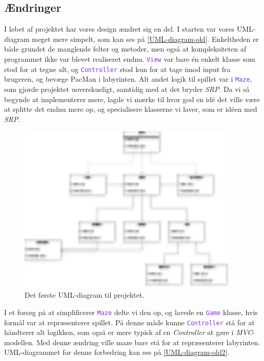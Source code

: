 \documentclass{article}
\newcommand{\class}[1]{\textcolor{BlueViolet}{\small\texttt{#1}}}
\theoremstyle{mytheoremstyle}
\theoremstyle{mytheoremstyle}
\theoremstyle{myproblemstyle}
\begin{document}
\subsection{Ændringer}\label{sub:Ændringer} %
I løbet af projektet har vores design ændret sig en del. I starten var vores
UML-diagram meget mere simpelt, som kan ses på \autoref{UML-diagram-old}.
Enkeltheden er både grundet de manglende felter og metoder, men også at
kompleksiteten af programmet ikke var blevet realiseret endnu. \class{View} var
bare én enkelt klasse som stod for at tegne alt, og \class{Controller} stod kun
for at tage imod input fra brugeren, og bevæge PacMan i labyrinten. Alt
andet logik til spillet var i \class{Maze}, som gjorde projektet uoverskueligt,
samtidig med at det bryder \textit{SRP}. Da vi så begynde at implementerer mere,
lagde vi mærke til hvor god en idé det ville være at splitte det endnu mere op,
og specialisere klasserne vi laver, som er idéen med \textit{SRP}.
\begin{figure}[H]
    \begin{center}
        \includegraphics[width=0.95\textwidth]{figures/UML-diagram-old.png}
    \end{center}
    \caption{Det første UML-diagram til projektet.}
    \label{UML-diagram-old}
\end{figure}
I et forsøg på at simplificerer \class{Maze} delte vi den op, og lavede en
\class{Game} klasse, hvis formål var at repræsenterer spillet. På denne måde
kunne \class{Controller} stå for at håndterer alt logikken, som også er mere
typisk af en \textit{Controller} at gøre i \textit{MVC}-modellen. Med denne
ændring ville maze bare stå for at repræsenterer labyrinten. UML-diagrammet for
denne forbedring kan ses på \autoref{UML-diagram-old2}.
\end{document}
